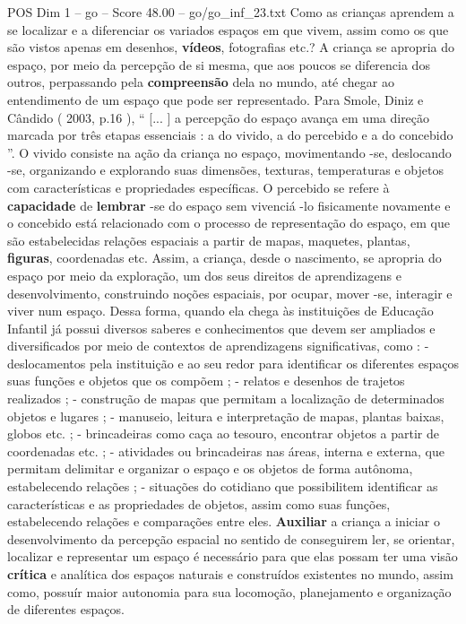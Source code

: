 \begin{textsample}{POS Dim 1 – go – Score 48.00 – go/go\_inf\_23.txt}
Como as crianças aprendem a se localizar e a diferenciar os variados espaços em que vivem, assim como os que são vistos apenas em desenhos, \textbf{vídeos}, fotografias etc.?
A criança se apropria do espaço, por meio da percepção de si mesma, que aos poucos se diferencia dos outros, perpassando pela \textbf{compreensão} dela no mundo, até chegar ao entendimento de um espaço que pode ser representado.
Para Smole, Diniz e Cândido ( 2003, p.16 ), “ [... ] a percepção do espaço avança em uma direção marcada por três etapas essenciais : a do vivido, a do percebido e a do concebido ”.
O vivido consiste na ação da criança no espaço, movimentando -se, deslocando -se, organizando e explorando suas dimensões, texturas, temperaturas e objetos com características e propriedades específicas.
O percebido se refere à \textbf{capacidade} de \textbf{lembrar} -se do espaço sem vivenciá -lo fisicamente novamente e o concebido está relacionado com o processo de representação do espaço, em que são estabelecidas relações espaciais a partir de mapas, maquetes, plantas, \textbf{figuras}, coordenadas etc.
Assim, a criança, desde o nascimento, se apropria do espaço por meio da exploração, um dos seus direitos de aprendizagens e desenvolvimento, construindo noções espaciais, por ocupar, mover -se, interagir e viver num espaço.
Dessa forma, quando ela chega às instituições de Educação Infantil já possui diversos saberes e conhecimentos que devem ser ampliados e diversificados por meio de contextos de aprendizagens significativas, como : - deslocamentos pela instituição e ao seu redor para identificar os diferentes espaços suas funções e objetos que os compõem ; - relatos e desenhos de trajetos realizados ; - construção de mapas que permitam a localização de determinados objetos e lugares ; - manuseio, leitura e interpretação de mapas, plantas baixas, globos etc. ; - brincadeiras como caça ao tesouro, encontrar objetos a partir de coordenadas etc. ; - atividades ou brincadeiras nas áreas, interna e externa, que permitam delimitar e organizar o espaço e os objetos de forma autônoma, estabelecendo relações ; - situações do cotidiano que possibilitem identificar as características e as propriedades de objetos, assim como suas funções, estabelecendo relações e comparações entre eles. \textbf{Auxiliar} a criança a iniciar o desenvolvimento da percepção espacial no sentido de conseguirem ler, se orientar, localizar e representar um espaço é necessário para que elas possam ter uma visão \textbf{crítica} e analítica dos espaços naturais e construídos existentes no mundo, assim como, possuír maior autonomia para sua locomoção, planejamento e organização de diferentes espaços.

\end{textsample}

